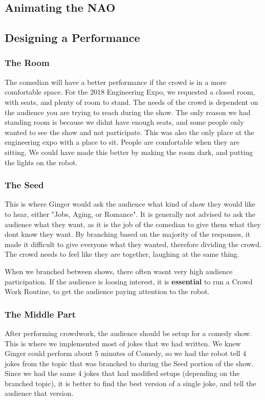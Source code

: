 \documentclass[onecolumn, draftclsnofoot,10pt, compsoc]{IEEEtran}
\begin{document}
\subsection{Animating the NAO}
\subsection{Designing a Performance}
    
    \subsubsection{The Room}
    The comedian will have a better performance if the crowd is in a more comfortable space.
    For the 2018 Engineering Expo, we requested a closed room, with seats, and plenty of room to stand.
    The needs of the crowd is dependent on the audience you are trying to reach during the show.
    The only reason we had standing room is because we didnt have enough seats, and some people only wanted to see the show and not participate.
    This was also the only place at the engineering expo with a place to sit.
    People are comfortable when they are sitting.
    We could have made this better by making the room dark, and putting the lights on the robot.
    \subsubsection{The Seed}
    This is where Ginger would ask the audience what kind of show they would like to hear, either "Jobs, Aging, or Romance".
    It is generally not advised to ask the audience what they want, as it is the job of the comedian to give them what they dont know they want.
    By branching based on the majority of the responses, it made it difficult to give everyone what they wanted, therefore dividing the crowd.
    The crowd needs to feel like they are together, laughing at the same thing.

    
    When we branched between shows, there often wasnt very high audience participation. 
    If the audience is loosing interest, it is \textbf{essential} to run a Crowd Work Routine, to get the audience paying attention to the robot.
    \subsubsection{The Middle Part}

    After performing crowdwork, the audience should be setup for a comedy show. This is where we implemented most of jokes that we had written.
    We knew Ginger could perform about 5 minutes of Comedy, so we had the robot tell 4 jokes from the topic that was branched to during the Seed portion of the show.
    Since we had the same 4 jokes that had modified setups (depending on the branched topic), it is better to find the best version of a single joke, and tell the audience that version.
\end{document}
